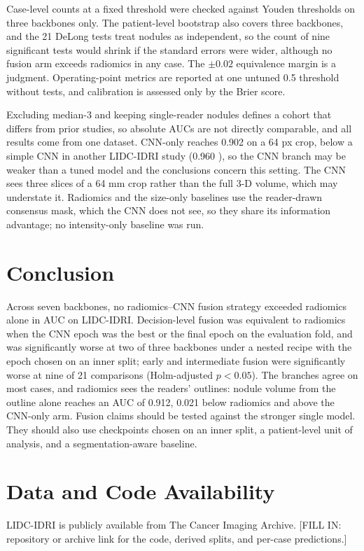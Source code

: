 \documentclass[conference]{IEEEtran}
\begin{document}
Case-level counts at a fixed threshold were checked against Youden thresholds on three backbones only. The patient-level bootstrap also covers three backbones, and the 21 DeLong tests treat nodules as independent, so the count of nine significant tests would shrink if the standard errors were wider, although no fusion arm exceeds radiomics in any case. The $\pm0.02$ equivalence margin is a judgment. Operating-point metrics are reported at one untuned 0.5 threshold without tests, and calibration is assessed only by the Brier score.

Excluding median-3 and keeping single-reader nodules defines a cohort that differs from prior studies, so absolute AUCs are not directly comparable, and all results come from one dataset. CNN-only reaches 0.902 on a 64 px crop, below a simple CNN in another LIDC-IDRI study (0.960 \cite{saied_efficient_2023}), so the CNN branch may be weaker than a tuned model and the conclusions concern this setting. The CNN sees three slices of a 64 mm crop rather than the full 3-D volume, which may understate it. Radiomics and the size-only baselines use the reader-drawn consensus mask, which the CNN does not see, so they share its information advantage; no intensity-only baseline was run.

\section{Conclusion}\label{sec:conclusion}
Across seven backbones, no radiomics--CNN fusion strategy exceeded radiomics alone in AUC on LIDC-IDRI. Decision-level fusion was equivalent to radiomics when the CNN epoch was the best or the final epoch on the evaluation fold, and was significantly worse at two of three backbones under a nested recipe with the epoch chosen on an inner split; early and intermediate fusion were significantly worse at nine of 21 comparisons (Holm-adjusted $p<0.05$). The branches agree on most cases, and radiomics sees the readers' outlines: nodule volume from the outline alone reaches an AUC of 0.912, 0.021 below radiomics and above the CNN-only arm. Fusion claims should be tested against the stronger single model. They should also use checkpoints chosen on an inner split, a patient-level unit of analysis, and a segmentation-aware baseline.

\section*{Data and Code Availability}
LIDC-IDRI is publicly available from The Cancer Imaging Archive. [FILL IN: repository or archive link for the code, derived splits, and per-case predictions.]
\end{document}
